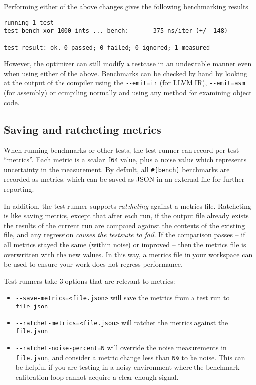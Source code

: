\documentclass[]{article}
\begin{document}
Performing either of the above changes gives the following benchmarking
results

\begin{verbatim}
running 1 test
test bench_xor_1000_ints ... bench:       375 ns/iter (+/- 148)

test result: ok. 0 passed; 0 failed; 0 ignored; 1 measured
\end{verbatim}

However, the optimizer can still modify a testcase in an undesirable
manner even when using either of the above. Benchmarks can be checked by
hand by looking at the output of the compiler using the
\texttt{-\/-emit=ir} (for LLVM IR), \texttt{-\/-emit=asm} (for assembly)
or compiling normally and using any method for examining object code.

\subsection{Saving and ratcheting
metrics}\label{saving-and-ratcheting-metrics}

When running benchmarks or other tests, the test runner can record
per-test ``metrics''. Each metric is a scalar \texttt{f64} value, plus a
noise value which represents uncertainty in the measurement. By default,
all \texttt{\#{[}bench{]}} benchmarks are recorded as metrics, which can
be saved as JSON in an external file for further reporting.

In addition, the test runner supports \emph{ratcheting} against a
metrics file. Ratcheting is like saving metrics, except that after each
run, if the output file already exists the results of the current run
are compared against the contents of the existing file, and any
regression \emph{causes the testsuite to fail}. If the comparison passes
-- if all metrics stayed the same (within noise) or improved -- then the
metrics file is overwritten with the new values. In this way, a metrics
file in your workspace can be used to ensure your work does not regress
performance.

Test runners take 3 options that are relevant to metrics:

\begin{itemize}
\itemsep1pt\parskip0pt
\item
  \texttt{-\/-save-metrics=\textless{}file.json\textgreater{}} will save
  the metrics from a test run to \texttt{file.json}
\item
  \texttt{-\/-ratchet-metrics=\textless{}file.json\textgreater{}} will
  ratchet the metrics against the \texttt{file.json}
\item
  \texttt{-\/-ratchet-noise-percent=N} will override the noise
  measurements in \texttt{file.json}, and consider a metric change less
  than \texttt{N\%} to be noise. This can be helpful if you are testing
  in a noisy environment where the benchmark calibration loop cannot
  acquire a clear enough signal.
\end{itemize}
\end{document}
